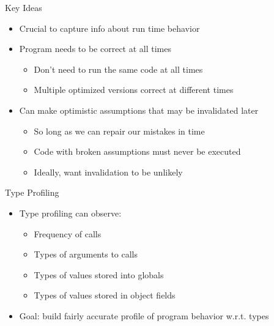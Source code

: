 \begin{frame}{Key Ideas}
    \begin{itemize}
        \item Crucial to capture info about run time behavior
        \item Program needs to be correct at all times
        \begin{itemize}
            \item Don't need to run the same code at all times
            \item Multiple optimized versions correct at different times
        \end{itemize}

        \item Can make optimistic assumptions that may be invalidated later
        \begin{itemize}
            \item So long as we can repair our mistakes in time
            \item Code with broken assumptions must never be executed
            \item Ideally, want invalidation to be unlikely
        \end{itemize}
    \end{itemize}
\end{frame}

\begin{frame}{Type Profiling}
    \begin{itemize}
        \item Type profiling can observe:
        \begin{itemize}
            \item Frequency of calls
            \item Types of arguments to calls
            \item Types of values stored into globals
            \item Types of values stored in object fields
        \end{itemize}

        \item Goal: build fairly accurate profile of program behavior w.r.t. types
    \end{itemize}
\end{frame}

